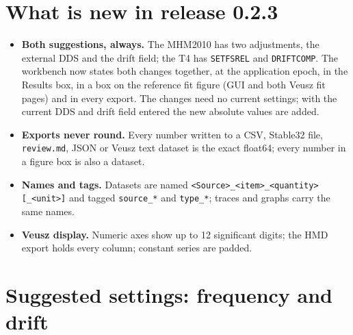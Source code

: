 \documentclass[11pt,a4paper]{article}
\begin{document}
\section{What is new in release 0.2.3}
\begin{itemize}
\item \textbf{Both suggestions, always.} The MHM2010 has two adjustments, the external DDS and the
drift field; the T4 has \texttt{SETFSREL} and \texttt{DRIFTCOMP}. The workbench now states both changes
together, at the application epoch, in the Results box, in a box on the reference fit figure (GUI and
both Veusz fit pages) and in every export. The changes need no current settings; with the current
DDS and drift field entered the new absolute values are added.
\item \textbf{Exports never round.} Every number written to a CSV, Stable32 file, \texttt{review.md},
JSON or Veusz text dataset is the exact float64; every number in a figure box is also a dataset.
\item \textbf{Names and tags.} Datasets are named \texttt{<Source>\_<item>\_<quantity>[\_<unit>]}
and tagged \texttt{source\_*} and \texttt{type\_*}; traces and graphs carry the same names.
\item \textbf{Veusz display.} Numeric axes show up to 12 significant digits; the HMD export holds
every column; constant series are padded.
\end{itemize}

\section{Suggested settings: frequency and drift}
\end{document}
